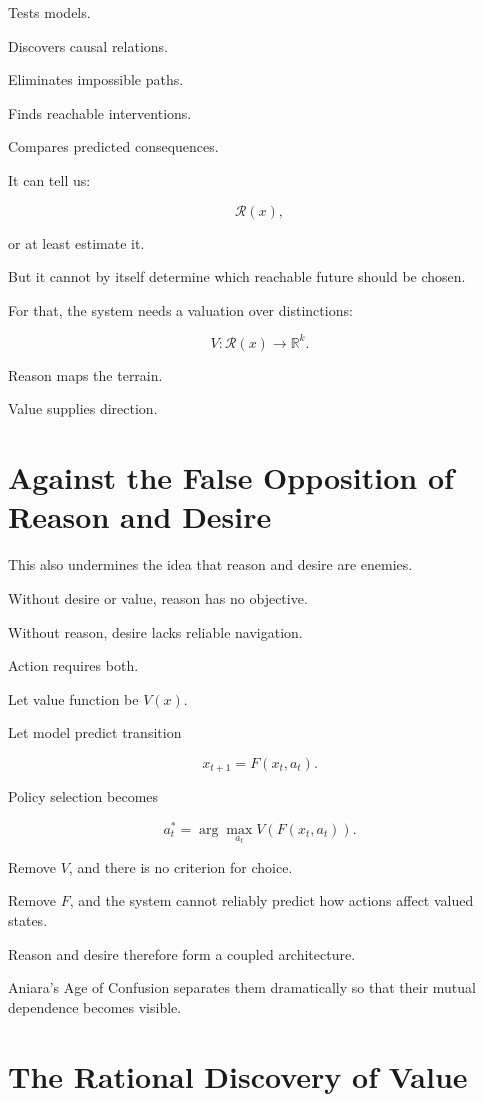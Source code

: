 \documentclass[11pt,oneside]{book}
\theoremstyle{definition}
\theoremstyle{remark}
\newcommand{\R}{\mathcal{R}}
\begin{document}
Tests models.

Discovers causal relations.

Eliminates impossible paths.

Finds reachable interventions.

Compares predicted consequences.

It can tell us:

\[
\R(x),
\]

or at least estimate it.

But it cannot by itself determine which reachable future should be chosen.

For that, the system needs a valuation over distinctions:

\[
V:\R(x)\rightarrow\mathbb R^k.
\]

Reason maps the terrain.

Value supplies direction.

\section{Against the False Opposition of Reason and Desire}

This also undermines the idea that reason and desire are enemies.

Without desire or value, reason has no objective.

Without reason, desire lacks reliable navigation.

Action requires both.

Let value function be \(V(x)\).

Let model predict transition

\[
x_{t+1}=F(x_t,a_t).
\]

Policy selection becomes

\[
a_t^\ast
=
\arg\max_{a_t}
V(F(x_t,a_t)).
\]

Remove \(V\), and there is no criterion for choice.

Remove \(F\), and the system cannot reliably predict how actions affect valued states.

Reason and desire therefore form a coupled architecture.

Aniara's Age of Confusion separates them dramatically so that their mutual dependence becomes visible.

\section{The Rational Discovery of Value}
\end{document}
